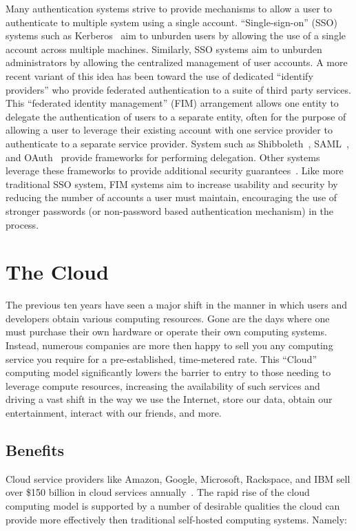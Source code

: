 Many authentication systems strive to provide mechanisms to allow a
user to authenticate to multiple system using a single account.
``Single-sign-on'' (SSO) systems such as Kerberos~\cite{neuman1994,
  kohl1994} aim to unburden users by allowing the use of a single
account across multiple machines. Similarly, SSO systems aim to
unburden administrators by allowing the centralized management of user
accounts. A more recent variant of this idea has been toward the use
of dedicated ``identify providers'' who provide federated
authentication to a suite of third party services. This ``federated
identity management'' (FIM) arrangement allows one entity to delegate
the authentication of users to a separate entity, often for the
purpose of allowing a user to leverage their existing account with one
service provider to authenticate to a separate service
provider. System such as Shibboleth~\cite{leandro2012},
SAML~\cite{SAML}, and OAuth~\cite{oauth} provide frameworks for
performing delegation. Other systems leverage these frameworks to
provide additional security guarantees~\cite{bhargava2011}. Like more
traditional SSO system, FIM systems aim to increase usability and
security by reducing the number of accounts a user must maintain,
encouraging the use of stronger passwords (or non-password based
authentication mechanism) in the process.

\section{The Cloud}
\label{chap:background:cloud}

The previous ten years have seen a major shift in the manner in which
users and developers obtain various computing resources. Gone are the
days where one must purchase their own hardware or operate their own
computing systems. Instead, numerous companies are more then happy to
sell you any computing service you require for a pre-established,
time-metered rate. This ``Cloud'' computing model significantly lowers
the barrier to entry to those needing to leverage compute resources,
increasing the availability of such services and driving a vast shift
in the way we use the Internet, store our data, obtain our
entertainment, interact with our friends, and more.

\subsection{Benefits}

Cloud service providers like Amazon, Google, Microsoft, Rackspace,
and IBM sell over \$150 billion in cloud services
annually~\cite{flood2013}. The rapid rise of the cloud computing model
is supported by a number of desirable qualities the cloud can provide
more effectively then traditional self-hosted computing
systems. Namely:

